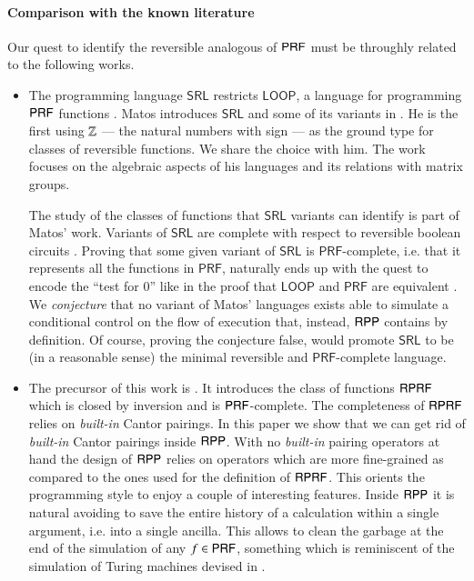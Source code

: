 \paragraph{Comparison with the known literature}
Our quest to identify the reversible  analogous of $ \mathsf{P}\mathsf{RF} $  must be throughly related to the following works.
\begin{itemize}
\item 
The programming language $ \mathsf{SRL} $  restricts $ \mathsf{LOOP} $, a language 
for programming $\mathsf{P}\mathsf{RF}$ functions \cite{meyer1967acm}. 
Matos introduces $ \mathsf{SRL} $ and some of its variants in \cite{matos03tcs}.
He is the first using $ \mathbb{Z} $ --- the natural numbers with sign --- as the ground type for 
classes of reversible functions.
We share the choice with him.
The work \cite{matos03tcs} focuses on the algebraic aspects of his languages and its relations with 
matrix groups. 

The study of the classes of functions that $ \mathsf{SRL} $ variants can identify
  is part of Matos' work.
Variants of $\mathsf{SRL}$ are complete with respect to reversible boolean circuits \cite{matos2016notes}.
Proving that some given variant of $\mathsf{SRL}$ is $ \mathsf{PRF} $-complete,
i.e. that it represents all the functions in $ \mathsf{PRF} $, naturally ends up with the quest 
to encode the ``test for 0'' like in the proof that $ \mathsf{LOOP} $ and $ \mathsf{PRF} $ are equivalent \cite{meyer1967acm}. 
We \emph{conjecture} that no variant of Matos' languages exists able to simulate a conditional 
control on the flow of execution that, instead, $ \mathsf{RPP} $ contains by definition.
Of course, proving the conjecture false, would promote $\mathsf{SRL}$ to be (in a reasonable sense) the minimal reversible and 
$ \mathsf{PRF} $-complete language.

\item The precursor of this work is \cite{PaoliniPiccoloRoversiICTCS2015}. It introduces the class of functions $ \mathsf{R}\mathsf{P}\mathsf{RF} $ which is closed by inversion and is $\mathsf{P}\mathsf{RF}$-complete. 
The completeness of $ \mathsf{R}\mathsf{P}\mathsf{RF} $ relies on \emph{built-in} Cantor pairings.
In this paper we show that we can get rid of \emph{built-in} Cantor pairings inside $ \mathsf{RPP} $.
With no \emph{built-in} pairing operators at hand the design of $ \mathsf{RPP} $ relies on operators which are more fine-grained as compared
to the ones used for the definition of $ \mathsf{R}\mathsf{P}\mathsf{RF} $.
This orients the programming style to enjoy a couple of interesting features.
Inside $ \mathsf{RPP} $ it is natural avoiding to save the entire history of a calculation within a single argument, i.e. into a single ancilla.
This allows to clean the garbage at the end of the simulation of any $ f\in\mathsf{P}\mathsf{RF} $, something which is reminiscent of the simulation 
of Turing machines devised in \cite{bennett1989siamjc}.


\end{itemize}
